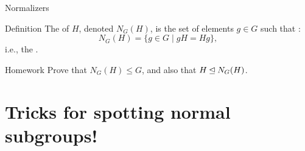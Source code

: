 \documentclass[8pt, handout]{beamer}
\newcommand{\Pause}{\pause}      %
\begin{document}
\begin{frame}{Normalizers}
  \vspace{-2mm}\Pause
  
  \begin{block}{Definition}
    The  of $H$, denoted
    $N_G(H)$, is the set of elements $g\in G$ such that :
    \[
    N_G(H)=\big\{g\in G\mid gH=Hg\big\},
    \]
    i.e., the . 
  \end{block} \Pause

  \begin{alertblock}{Homework}
    Prove that $N_G(H) \leq G$, and also that $H \unlhd N_G(H)$.
  \end{alertblock}
  
\end{frame}

\section{Tricks for spotting normal subgroups!}
\end{document}
